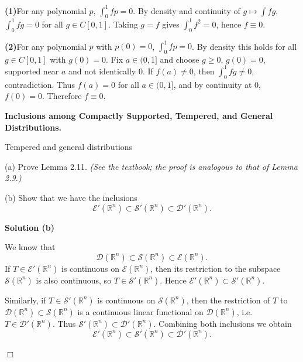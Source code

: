 \begin{solution}
\par\medskip\noindent\textbf{(1)}\quad  For any polynomial $p$, $\int_0^1 f p=0$. By density and continuity of $g\mapsto\int f g$,
	$\int_0^1 f g=0$ for all $g\in C[0,1]$. Taking $g=f$ gives $\int_0^1 f^2=0$, hence $f\equiv0$.

	\par\medskip\noindent\textbf{(2)}\quad  For any polynomial $p$ with $p(0)=0$, $\int_0^1 f p=0$. By density this holds for all
	$g\in C[0,1]$ with $g(0)=0$. Fix $a\in(0,1]$ and choose $g\ge0$, $g(0)=0$, supported near $a$ and not identically $0$.
	If $f(a)\ne0$, then $\int_0^1 f g\ne0$, contradiction. Thus $f(a)=0$ for all $a\in(0,1]$, and by continuity at $0$,
	$f(0)=0$. Therefore $f\equiv0$.
\end{solution}

\begin{problem}[CP-II-0254]
\label{prob:cp-ii-0254}
\textbf{Inclusions among Compactly Supported, Tempered, and General Distributions.}

\hspace*{1.5em}Tempered and general distributions

\noindent
(a)\; Prove Lemma 2.11. \emph{(See the textbook; the proof is analogous
	to that of Lemma 2.9.)}

\medskip\noindent
(b)\; Show that we have the inclusions
\[
\mathcal{E}'(\mathbb{R}^n)\subset\mathcal{S}'(\mathbb{R}^n)
\subset\mathcal{D}'(\mathbb{R}^n).
\]
\end{problem}

\begin{solution}

\par\medskip\noindent\textbf{Solution (b)}\par\smallskip

We know that
\[
\mathcal{D}(\mathbb{R}^n)\subset\mathcal{S}(\mathbb{R}^n)
\subset\mathcal{E}(\mathbb{R}^n).
\]
If $T\in\mathcal{E}'(\mathbb{R}^n)$ is continuous on
$\mathcal{E}(\mathbb{R}^n)$, then its restriction to the subspace
$\mathcal{S}(\mathbb{R}^n)$ is also continuous, so
$T\in\mathcal{S}'(\mathbb{R}^n)$. Hence
$\mathcal{E}'(\mathbb{R}^n)\subset\mathcal{S}'(\mathbb{R}^n)$.

Similarly, if $T\in\mathcal{S}'(\mathbb{R}^n)$ is continuous on
$\mathcal{S}(\mathbb{R}^n)$, then the restriction of $T$ to
$\mathcal{D}(\mathbb{R}^n)\subset\mathcal{S}(\mathbb{R}^n)$ is a
continuous linear functional on $\mathcal{D}(\mathbb{R}^n)$, i.e.\
$T\in\mathcal{D}'(\mathbb{R}^n)$. Thus
$\mathcal{S}'(\mathbb{R}^n)\subset\mathcal{D}'(\mathbb{R}^n)$.
Combining both inclusions we obtain
\[
\mathcal{E}'(\mathbb{R}^n)\subset\mathcal{S}'(\mathbb{R}^n)
\subset\mathcal{D}'(\mathbb{R}^n).
\]

\hfill$\Box$
\end{solution}

